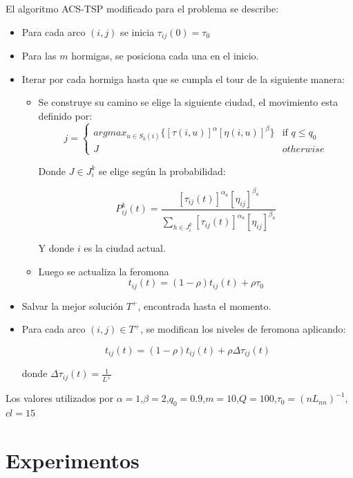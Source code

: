 \documentclass[letter, 10pt]{article}
\begin{document}
El algoritmo ACS-TSP modificado para el problema se describe:
\begin{itemize}
	\item Para cada arco $(i,j)$ se inicia $\tau_{ij}(0) = \tau_0$
	\item Para las $m$ hormigas, se posiciona cada una en el inicio.
	\item Iterar por cada hormiga hasta que se cumpla el tour de la siguiente manera:
	\begin{itemize}
	\item Se construye su camino se elige la siguiente ciudad, el movimiento esta definido por:
\begin{equation}
j = \begin{cases} arg max_{u \in S_{k}(i)} \{ [\tau(i,u)]^\alpha [\eta(i,u)]^\beta\} &\mbox{if } q \leq q_0 \\ 
J & otherwise \end{cases} 
\end{equation}

Donde $J \in J_i^k$ se elige según la probabilidad:

	\begin{equation}
		P_{ij}^k(t) = \frac{[\tau_{ij}(t)]^{\alpha_a}[\eta_{ij}]^{\beta_a}}{\sum_{h \in J_i^k } [\tau_{ij}(t)]^{\alpha_a}[\eta_{ij}]^{\beta_a}}
	\end{equation}
	
Y donde $i$ es la ciudad actual.
\item Luego se actualiza la feromona
\begin{equation}
	t_{ij}(t) = (1-\rho)t_{ij}(t) + \rho \tau_0
\end{equation}

	\end{itemize}

\item Salvar la mejor solución $T^+$, encontrada hasta el momento.
\item Para cada arco $(i,j) \in T^+$, se modifican los niveles de feromona aplicando:

\begin{equation}
	t_{ij}(t) = (1-\rho)t_{ij}(t) + \rho \Delta \tau_{ij}(t)
\end{equation}

donde $\Delta \tau_{ij}(t) = \frac{1}{L^+}$
\end{itemize} 
Los valores utilizados por $\alpha=1$,$\beta=2$,$q_0=0.9$,$m=10$,$Q=100$,$\tau_0=(nL_{nn})^{-1}$,$cl=15$
\section{Experimentos}
\end{document}
